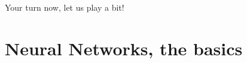 \documentclass[10pt]{beamer}
\renewcommand{\[}{\begin{equation*}}
\renewcommand{\]}{\end{equation*}}
\begin{document}
\begin{frame}
Your turn now, let us play a bit!
\end{frame}

\section{Neural Networks, the basics}



\end{document}
